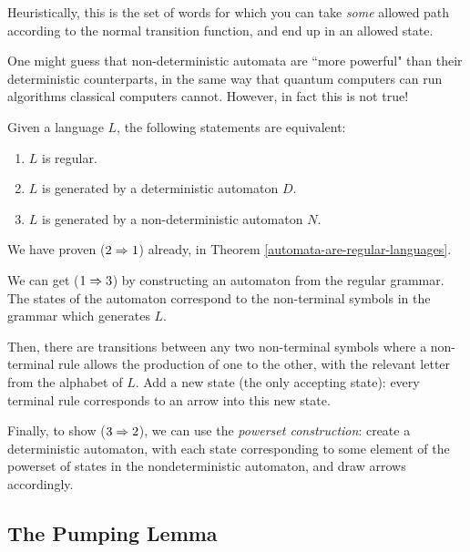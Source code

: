 \documentclass{article}
\begin{document}
\begin{note}
	Heuristically, this is the set of words for which you can take \textit{some} allowed path according to the normal transition function, and end up in an allowed state.
\end{note}

One might guess that non-deterministic automata are ``more powerful" than their deterministic counterparts, in the same way that quantum computers can run algorithms classical computers cannot. However, in fact this is not true!

\begin{theorem}
	\label{automata-are-regular-languages-redux}
	Given a language $L$, the following statements are equivalent:
	\begin{enumerate}
		\item $L$ is regular.
		\item $L$ is generated by a deterministic automaton $D$.
		\item $L$ is generated by a non-deterministic automaton $N$.
	\end{enumerate}
\end{theorem}

\begin{prf}
	We have proven ($2 \Rightarrow 1$) already, in Theorem \ref{automata-are-regular-languages}.
	    
	We can get ($1 \Rightarrow 3$) by constructing an automaton from the regular grammar. The states of the automaton correspond to the non-terminal symbols in the grammar which generates $L$.
	    
	Then, there are transitions between any two non-terminal symbols where a non-terminal rule allows the production of one to the other, with the relevant letter from the alphabet of $L$. Add a new state (the only accepting state): every terminal rule corresponds to an arrow into this new state.
	    
	Finally, to show ($3 \Rightarrow 2$), we can use the \textit{powerset construction}: create a deterministic automaton, with each state corresponding to some element of the powerset of states in the nondeterministic automaton, and draw arrows accordingly.
\end{prf}

\subsection{The Pumping Lemma}
\end{document}
